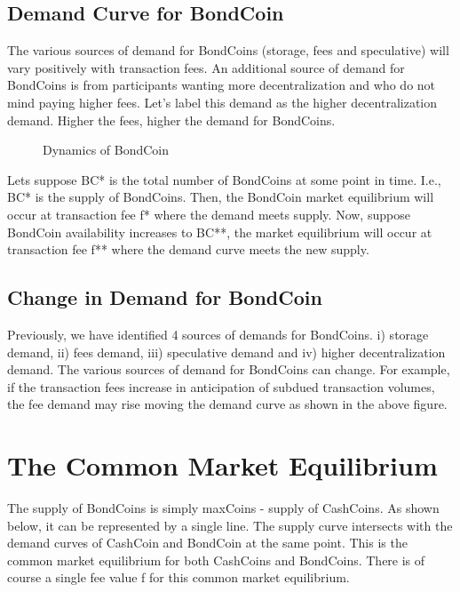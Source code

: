 \subsection{Demand Curve for BondCoin}

The various sources of demand for BondCoins (storage, fees and speculative) will vary positively with transaction fees. An additional source of demand for BondCoins is from participants wanting more decentralization and who do not mind paying higher fees. Let’s label this demand as the higher decentralization demand. Higher the fees, higher the demand for BondCoins.

\begin{figure} [!htbp]
\centering    
{}
\caption{Dynamics of BondCoin}
\end{figure}

Lets suppose BC* is the total number of BondCoins at some point in time. I.e., BC* is the supply of BondCoins. Then, the BondCoin market equilibrium will occur at transaction fee f* where the demand meets supply. Now, suppose BondCoin availability increases to BC**, the market equilibrium will occur at transaction fee f** where the demand curve meets the new supply.

\subsection{Change in Demand for BondCoin}

Previously, we have identified 4 sources of demands for BondCoins. i) storage demand, ii) fees demand, iii) speculative demand and iv) higher decentralization demand. The various sources of demand for BondCoins can change. For example, if the transaction fees increase in anticipation of subdued transaction volumes, the fee demand may rise moving the demand curve as shown in the above figure.

\section{The Common Market Equilibrium}

The supply of BondCoins is simply maxCoins - supply of CashCoins. As shown below, it can be represented by a single line. The supply curve intersects with the demand curves of CashCoin and BondCoin at the same point. This is the common market equilibrium for both CashCoins and BondCoins. There is of course a single fee value f for this common market equilibrium.


